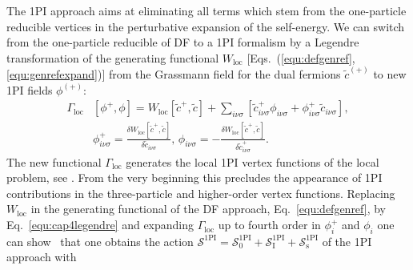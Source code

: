 \documentclass[rmp,aps,reprint,amsmath,amssymb,superscriptaddress,showpacs,nofootinbib]{revtex4-1}
\newcommand{\gr}[1] {\textcolor{green}{GR: #1}}
\newcommand{\kh}[1] {\textcolor{green}{KH: #1}}
\begin{document}
The 1PI approach aims at eliminating all terms which stem from the one-particle reducible vertices in the perturbative expansion of the self-energy. We can switch  from the one-particle reducible of DF to a 1PI formalism by a  Legendre transformation of the generating functional $W_{\text{loc}}$ [Eqs.~(\ref{equ:defgenref},\ref{equ:genrefexpand})] from the Grassmann field for the dual fermions $\widetilde{c}^{(+)}$ to new 1PI fields 
 $\phi^{(+)}$:
\begin{align}
\label{equ:cap4legendre}
  \Gamma_{\text{loc}}&[\phi^+,\phi] =  W_{\text{loc}}[\widetilde{c}^+,\widetilde{c}]
  +\sum_{i\nu\sigma}\left[\widetilde{c}_{i\nu\sigma}^+\phi_{i\nu\sigma}+\phi^+_{i\nu\sigma}\widetilde{c}_{i\nu\sigma}\right],\nonumber\\& 
  \phi^+_{i\nu\sigma}=\frac{\delta W_{\text{loc}}[\widetilde{c}^+,\widetilde{c}]
  }{\delta\widetilde{c}_{i\nu\sigma}},  \,
  \phi_{i\nu\sigma}=-\frac{\delta W_{\text{loc}}[\widetilde{c}^+,\widetilde{c}]
  }{\delta \widetilde{c}^{+}_{i\nu\sigma}}.
\end{align}
The new functional $\Gamma_{\text{loc}}$ generates the local 1PI vertex functions of the local problem, see . From the very beginning this precludes the appearance of 1PI contributions in the three-particle and higher-order vertex functions. Replacing $W_{\text{loc}}$ in the generating functional of the DF approach, Eq.~\eqref{equ:defgenref}, by Eq.~\eqref{equ:cap4legendre} and expanding $\Gamma_{\text{loc}}$ up to fourth order in $\phi^+_i$ and $\phi_i$
one can show~\cite{Rohringer2013,Rohringer2013a} that one obtains the action $\mathcal{S}^{\text{1PI}}=\mathcal{S}^{\text{1PI}}_0+\mathcal{S}^{\text{1PI}}_{\text{I}}+\mathcal{S}^{\text{1PI}}_{\text{s}}$ of the 1PI approach with 
\end{document}
